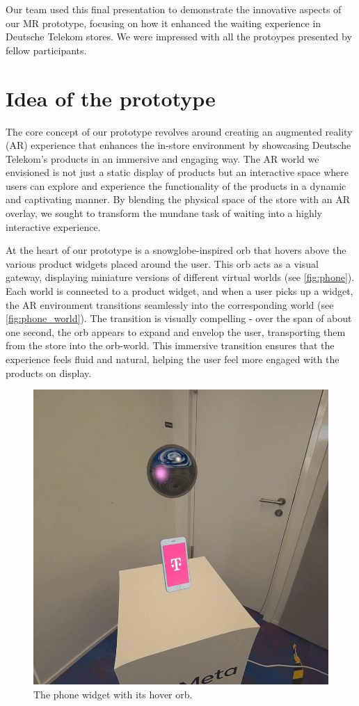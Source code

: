 \documentclass[12pt]{article}
\begin{document}
Our team used this final presentation to demonstrate the innovative aspects of our MR prototype, focusing on how it enhanced the waiting experience in Deutsche Telekom stores. We were impressed with all the protoypes presented by fellow participants. 

\section{Idea of the prototype}
\label{sec:idea}
The core concept of our prototype revolves around creating an augmented reality (AR) experience that enhances the in-store environment by showcasing Deutsche Telekom’s products in an immersive and engaging way. The AR world we envisioned is not just a static display of products but an interactive space where users can explore and experience the functionality of the products in a dynamic and captivating manner. By blending the physical space of the store with an AR overlay, we sought to transform the mundane task of waiting into a highly interactive experience.

At the heart of our prototype is a snowglobe-inspired orb that hovers above the various product widgets placed around the user. This orb acts as a visual gateway, displaying miniature versions of different virtual worlds (see \autoref{fig:phone}). Each world is connected to a product widget, and when a user picks up a widget, the AR environment transitions seamlessly into the corresponding world (see \autoref{fig:phone_world}).  The transition is visually compelling - over the span of about one second, the orb appears to expand and envelop the user, transporting them from the store into the orb-world. This immersive transition ensures that the experience feels fluid and natural, helping the user feel more engaged with the products on display. 

\begin{figure}[ht]
    \centering
    \includegraphics[width=0.5\linewidth]{images/phone.png}
    \caption{The phone widget with its hover orb.}
    \label{fig:phone}
\end{figure}
\end{document}
